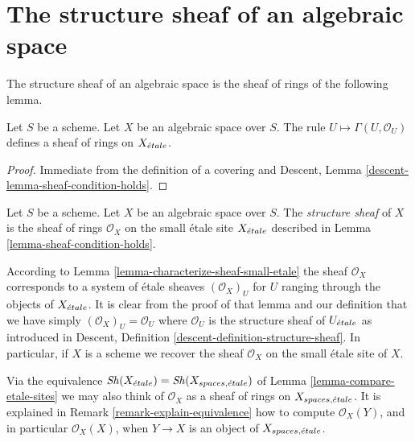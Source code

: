 \section{The structure sheaf of an algebraic space}
\label{section-structure-sheaf}

\noindent
The structure sheaf of an algebraic space is the sheaf of rings of the
following lemma.

\begin{lemma}
\label{lemma-sheaf-condition-holds}
Let $S$ be a scheme. Let $X$ be an algebraic space over $S$.
The rule $U \mapsto \Gamma(U, \mathcal{O}_U)$ defines
a sheaf of rings on $X_{\acute{e}tale}$.
\end{lemma}

\begin{proof}
Immediate from the definition of a covering and
Descent, Lemma \ref{descent-lemma-sheaf-condition-holds}.
\end{proof}

\begin{definition}
\label{definition-structure-sheaf}
Let $S$ be a scheme.
Let $X$ be an algebraic space over $S$.
The {\it structure sheaf} of $X$
is the sheaf of rings $\mathcal{O}_X$
on the small \'etale site $X_{\acute{e}tale}$ described in
Lemma \ref{lemma-sheaf-condition-holds}.
\end{definition}

\noindent
According to Lemma \ref{lemma-characterize-sheaf-small-etale} the sheaf
$\mathcal{O}_X$ corresponds to a system of \'etale sheaves $(\mathcal{O}_X)_U$
for $U$ ranging through the objects of $X_{\acute{e}tale}$. It is clear from
the proof of that lemma and our definition that we have simply
$(\mathcal{O}_X)_U = \mathcal{O}_U$ where $\mathcal{O}_U$ is the structure
sheaf of $U_{\acute{e}tale}$ as introduced in
Descent, Definition \ref{descent-definition-structure-sheaf}.
In particular, if $X$ is a scheme we recover the sheaf $\mathcal{O}_X$
on the small \'etale site of $X$.

\medskip\noindent
Via the equivalence
$\mathop{\mathit{Sh}}\nolimits(X_{\acute{e}tale}) = \mathop{\mathit{Sh}}\nolimits(X_{spaces, {\acute{e}tale}})$
of Lemma \ref{lemma-compare-etale-sites} we may also think of $\mathcal{O}_X$
as a sheaf of rings on $X_{spaces, {\acute{e}tale}}$. It is explained in
Remark \ref{remark-explain-equivalence}
how to compute $\mathcal{O}_X(Y)$, and in particular $\mathcal{O}_X(X)$, when
$Y \to X$ is an object of $X_{spaces, {\acute{e}tale}}$.

